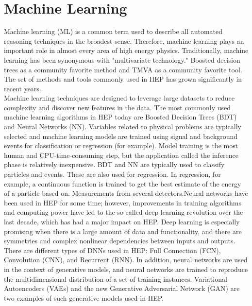 \chapter{\label{ML}Machine Learning}

Machine learning (ML) is a common term used to describe all automated reasoning techniques in the broadest sense. Therefore, machine learning plays an important role in almost every area of high energy physics. Traditionally, machine learning has been synonymous with "multivariate technology."  Boosted decision trees as a community favorite method and TMVA  as a community favorite tool. The set of methods and tools commonly used in HEP has grown significantly in recent years\cite{https://doi.org/10.48550/arxiv.2102.02770}. \\
Machine learning techniques are designed to leverage large datasets  to reduce complexity and discover new features in the data. The  most commonly used machine learning algorithms in HEP today are Boosted Decision Trees (BDT) and Neural Networks (NN). Variables related to physical problems are typically selected and  machine learning models are trained  using signal and background events for classification or regression (for example). Model training is the most human and CPU-time-consuming step, but the application called the  inference phase is relatively inexpensive. BDT and NN are typically used to classify particles and events. These are also used for regression. In regression, for example, a continuous function is trained to get the best estimate of the energy of a particle based on. 
 Measurements from several detectors.Neural networks have been used in HEP ​​for some time; however, improvements in training algorithms and computing power have led to the so-called deep learning revolution over the last decade, which has had a major impact on HEP\cite{https://doi.org/10.48550/arxiv.2102.02770}. Deep learning is especially promising when there is a large amount of data and functionality, and there are symmetries and complex nonlinear dependencies between inputs and outputs. There are different types of DNNs used in HEP: Full Connection (FCN), Convolution (CNN), and Recurrent (RNN). In addition, neural networks are used in the context of generative models, and neural networks are trained to reproduce the multidimensional distribution of a set of training instances. Variational Autoencoders (VAEs) and the new Generative Adversarial Network (GAN) are two examples of such generative models used in HEP.\\

